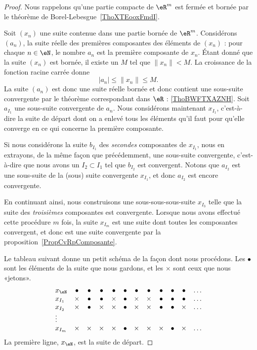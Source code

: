 \begin{proof}
	Nous rappelons qu'une partie compacte de \( \eR^m\) est fermée et bornée par le théorème de Borel-Lebesgue~\ref{ThoXTEooxFmdI}.

	Soit \( (x_n)\) une suite contenue dans une partie bornée de \( \eR^m\). Considérons \( (a_n)\), la suite réelle des premières composantes des éléments de \( (x_n)\) : pour chaque \( n\in\eN\), le nombre \( a_n\) est la première composante de \( x_n\). Étant donné que la suite \( (x_n)\) est bornée, il existe un \( M\) tel que \( \| x_n \|<M\). La croissance de la fonction racine carrée donne
	\begin{equation}
		| a_n |\leq\| x_n \|\leq M.
	\end{equation}
	La suite \( (a_n)\) est donc une suite réelle bornée et donc contient une sous-suite convergente par le théorème correspondant dans \( \eR\) :  \ref{ThoBWFTXAZNH}. Soit \( a_{I_1}\) une sous-suite convergente de \( a_n\). Nous considérons maintenant \( x_{I_1}\), c'est-à-dire la suite de départ dont on a enlevé tous les éléments qu'il faut pour qu'elle converge en ce qui concerne la première composante.

	Si nous considérons la suite \( b_{I_1}\) des \emph{secondes} composantes de \( x_{I_1}\), nous en extrayons, de la même façon que précédemment, une sous-suite convergente, c'est-à-dire que nous avons un \( I_2\subset I_1\) tel que \( b_{I_2}\) est convergent. Notons que \( a_{I_2}\) est une sous-suite de la (sous) suite convergente \( x_{I_1}\), et donc \( a_{I_2}\) est encore convergente.

	En continuant ainsi, nous construisons une sous-sous-sous-suite \( x_{I_3}\) telle que la suite des \emph{troisièmes} composantes est convergente. Lorsque nous avons effectué cette procédure \( m\) fois, la suite \( x_{I_m}\) est une suite dont toutes les composantes convergent, et donc est une suite convergente par la proposition~\ref{PropCvRpComposante}.

	Le tableau suivant donne un petit schéma de la façon dont nous procédons. Les \( \bullet\) sont les éléments de la suite que nous gardons, et les \( \times\) sont ceux que nous «jetons».
	\begin{equation}
		\begin{array}{lccccccccccc}
			x_{\eN} & \bullet & \bullet & \bullet & \bullet & \bullet & \bullet & \bullet & \bullet & \bullet & \bullet & \ldots \\
			x_{I_1} & \times  & \bullet & \bullet & \times  & \bullet & \times  & \times  & \bullet & \bullet & \bullet & \ldots \\
			x_{I_2} & \times  & \bullet & \times  & \times  & \bullet & \times  & \times  & \bullet & \bullet & \times  & \ldots \\
			\vdots                                                                                                               \\
			x_{I_m} & \times  & \times  & \times  & \times  & \bullet & \times  & \times  & \times  & \bullet & \times  & \ldots
		\end{array}
	\end{equation}
	La première ligne, \( x_{\eN}\), est la suite de départ.
\end{proof}


